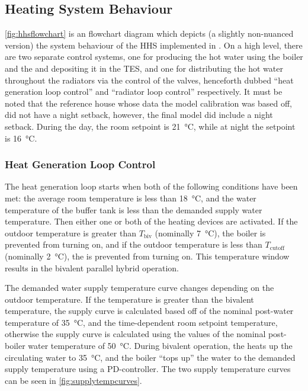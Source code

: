 \subsection{Heating System Behaviour}
\cref{fig:hhsflowchart} is an flowchart diagram which depicts (a slightly non-nuanced version) the system behaviour of the \ac{HHS} implemented in \modelica. 
On a high level, there are two separate control systems, one for producing the hot water using the boiler and the \HP and depositing it in the \ac{TES}, and one for distributing the hot water throughout the radiators via the control of the valves, henceforth dubbed ``heat generation loop control'' and ``radiator loop control'' respectively. It must be noted that the reference house whose data the model  calibration was based off, did not have a night setback, however, the final model did include a night setback. During the day, the room setpoint is \qty{21}{\celsius}, while at night the setpoint is \qty{16}{\celsius}.

\subsubsection{Heat Generation Loop Control}
The heat generation loop starts when both of the following conditions have been met: the average room temperature is less than \qty{18}{\celsius}, and the water temperature of the buffer tank is less than the demanded supply water temperature. Then either one or both of the heating devices are activated. If the outdoor temperature is greater than $T_\text{biv}$ (nominally \qty{7}{\celsius}), the boiler is prevented from turning on, and if the outdoor temperature is less than $T_\text{cutoff}$ (nominally \qty{2}{\celsius}), the \HP is prevented from turning on. This temperature window results in the bivalent parallel hybrid operation. 

The demanded water supply temperature curve changes depending on the outdoor temperature. If the temperature is greater than the bivalent temperature, the supply curve is calculated based off of the nominal post-\HP water temperature of \qty{35}{\celsius}, and the time-dependent room setpoint temperature, otherwise the supply curve is calculated using the values of the nominal post-boiler water temperature of \qty{50}{\celsius}. During bivalent operation, the \HP heats up the circulating water to \qty{35}{\celsius}, and the boiler ``tops up'' the water to the demanded supply temperature using a PD-controller. The two supply temperature curves can be seen in \cref{fig:supplytempcurves}.

